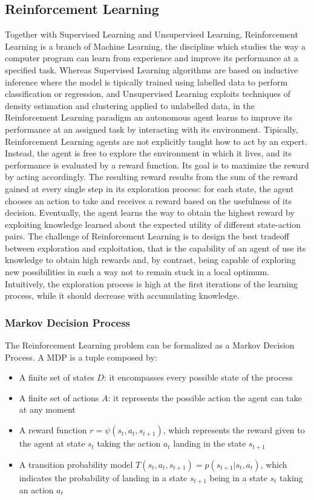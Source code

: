 \subsection{Reinforcement Learning}
Together with Supervised Learning and Unsupervised Learning, Reinforcement Learning is a branch of Machine Learning, the discipline which studies the way a computer program can learn from experience and improve its performance at a specified task. Whereas Supervised Learning algorithms are based on inductive inference where the model is tipically trained using labelled data to perform classification or regression, and Unsupervised Learning exploits techniques of density estimation and clustering applied to unlabelled data, in the Reinforcement Learning paradigm an autonomous agent learns to improve its performance at an assigned task by interacting with its environment.
Tipically, Reinforcement Learning agents are not explicitly taught how to act by an expert. Instead, the agent is free to explore the environment in which it lives, and its performance is evaluated by a reward function. Its goal is to maximize the reward by acting accordingly. The resulting reward results from the sum of the reward gained at every single step in its exploration process: for each state, the agent chooses an action to take and receives a reward based on the usefulness of its decision. Eventually, the agent learns the way to obtain the highest reward by exploiting knowledge learned about the expected utility of different state-action pairs. The challenge of Reinforcement Learning is to design the best tradeoff between exploration and exploitation, that is the capability of an agent of use its knowledge to obtain high rewards and, by contrast, being capable of exploring new possibilities in such a way not to remain stuck in a local optimum. Intuitively, the exploration process is high at the first iterations of the learning process, while it should decrease with accumulating knowledge.

\subsubsection{Markov Decision Process}
The Reinforcement Learning problem can be formalized as a Markov Decision Process. A MDP is a tuple composed by:
\begin{itemize}
  \item A finite set of states \(D\): it encompasses every possible state of the process
  \item A finite set of actions \(A\): it represents the possible action the agent can take at any moment
  	\item A reward function \(r = \psi(s_t,a_t,s_{t+1})\), which represents the reward given to the agent at state \(s_t\) taking the action \(a_t\) landing in the state \(s_{t+1}\)
  	\item A transition probability model \(T(s_t,a_t,s_{t+1}) = p(s_{t+1}|s_t,a_t)\), which indicates the probability of landing in a state \(s_{t+1}\) being in a state \(s_t\) taking an action \(a_t\)
\end{itemize}

